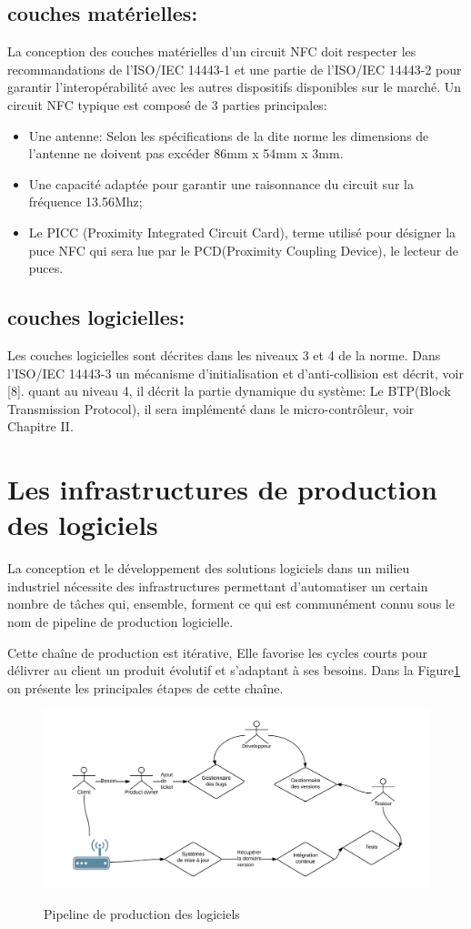 \documentclass{themeensg}
\begin{document}
\subsection{couches matérielles:}
La conception des couches matérielles d'un circuit NFC doit respecter les recommandations de l'ISO/IEC 14443-1 et une partie de l'ISO/IEC 14443-2 pour garantir l'interopérabilité avec les autres dispositifs disponibles sur le marché. Un circuit NFC typique est composé de 3 parties principales:
\begin{itemize}
\item Une antenne: Selon les spécifications de la dite norme les dimensions de l'antenne ne doivent pas excéder 86mm x 54mm x 3mm.
\item Une capacité adaptée pour garantir une raisonnance du circuit sur la fréquence 13.56Mhz;
\item Le PICC (Proximity Integrated Circuit Card), terme utilisé pour désigner la puce NFC qui sera lue par le PCD(Proximity Coupling Device), le lecteur de puces.
\end{itemize}
\subsection{couches logicielles:}
Les couches logicielles sont décrites dans les niveaux 3 et 4 de la norme. Dans l'ISO/IEC 14443-3 un mécanisme d'initialisation et d’anti-collision est décrit, voir [8]. quant au niveau 4, il décrit la partie dynamique du système: Le BTP(Block Transmission Protocol), il sera implémenté dans le micro-contrôleur, voir Chapitre II.

\section{Les infrastructures de production des logiciels}
La conception et le développement des solutions logiciels dans un milieu industriel nécessite des infrastructures permettant d'automatiser un certain nombre de tâches qui, ensemble, forment ce qui est communément connu sous le nom de pipeline de production logicielle.

Cette chaîne de production est itérative, Elle favorise les cycles courts pour délivrer au client un produit évolutif et s'adaptant à ses besoins. Dans la Figure\ref{fig:fig3} on présente les principales étapes de cette chaîne.

\begin{figure}
\centering
\includegraphics[scale=0.8]{images/fig3.png}
\label{fig:fig3}
\caption{Pipeline de production des logiciels}
\end{figure}
\end{document}
